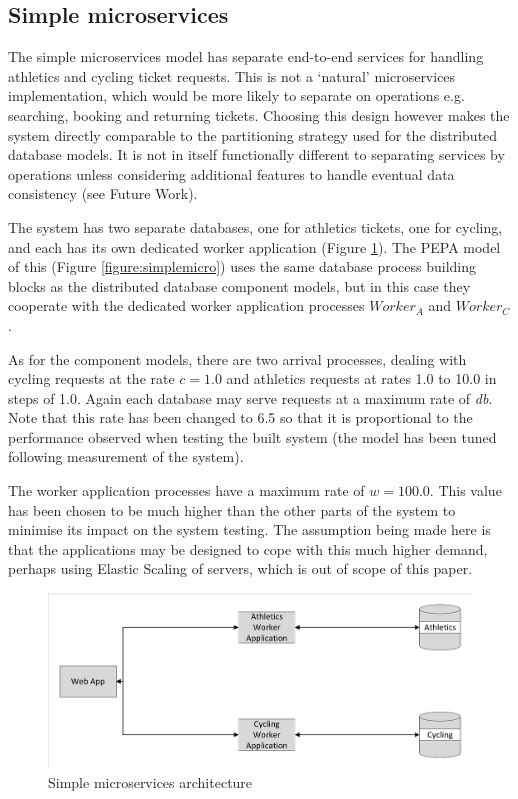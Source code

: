 \documentclass[runningheads]{llncs}
\begin{document}
%
%
\FloatBarrier
\subsection{Simple microservices}

The simple microservices model has separate end-to-end services for handling athletics and cycling ticket requests.  This is not a `natural' microservices implementation, which would be more likely to separate on operations e.g. searching, booking and returning tickets.  Choosing this design however makes the system directly comparable to the partitioning strategy used for the distributed database models.  It is not in itself functionally different to separating services by operations unless considering additional features to handle eventual data consistency (see Future Work).

The system has two separate databases, one for athletics tickets, one for cycling, and each has its own dedicated worker application (Figure \ref{figure:simplemicro_architecture}).  The PEPA model of this (Figure \ref{figure:simplemicro}) uses the same database process building blocks as the distributed database component models, but in this case they cooperate with the dedicated worker application processes $\mathit{Worker_A}$ and $\mathit{Worker_C}$.

As for the component models, there are two arrival processes, dealing with cycling requests at the rate $\mathit{c=1.0}$ and athletics requests at rates 1.0 to 10.0 in steps of 1.0.  Again each database may serve requests at a maximum rate of {\itshape db}.  Note that this rate has been changed to 6.5 so that it is proportional to the performance observed when testing the built system (the model has been tuned following measurement of the system).

The worker application processes have a maximum rate of $\mathit{w=100.0}$.  This value has been chosen to be much higher than the other parts of the system to minimise its impact on the system testing.  The assumption being made here is that the applications may be designed to cope with this much higher demand, perhaps using Elastic Scaling of servers, which is out of scope of this paper.

\begin{figure}
	\centering
	\includegraphics[trim = 5 5 5 5, clip, width=\textwidth]{img/simplemicro}
	\caption{Simple microservices architecture}
	\label{figure:simplemicro_architecture}
\end{figure}
\end{document}
